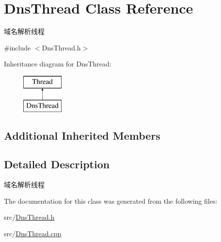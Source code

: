 \hypertarget{class_dns_thread}{}\section{Dns\+Thread Class Reference}
\label{class_dns_thread}


域名解析线程  




{\ttfamily \#include $<$Dns\+Thread.\+h$>$}

Inheritance diagram for Dns\+Thread\+:\begin{figure}[H]
\begin{center}
\leavevmode
\includegraphics[height=2.000000cm]{class_dns_thread}
\end{center}
\end{figure}
\subsection*{Additional Inherited Members}


\subsection{Detailed Description}
域名解析线程 

The documentation for this class was generated from the following files\+:\begin{DoxyCompactItemize}
\item 
src/\hyperlink{_dns_thread_8h}{Dns\+Thread.\+h}\item 
src/\hyperlink{_dns_thread_8cpp}{Dns\+Thread.\+cpp}\end{DoxyCompactItemize}
